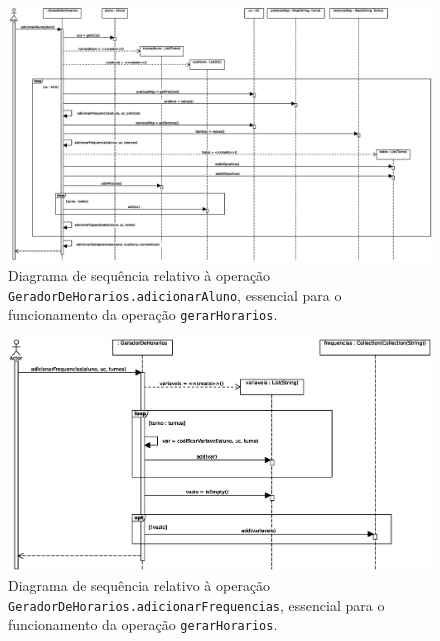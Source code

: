 \documentclass[12pt, a4paper]{article}
\begin{document}
\begin{landscape}
        \begin{figure}[H]
            \centering
            \includegraphics[scale=0.60]{Imagens/Modelos/gerarHorariosAdicionarAlunoDAO.svg.eps}
            \caption{
                Diagrama de sequência relativo à operação \texttt{GeradorDeHorarios.adicionarAluno},
                essencial para o funcionamento da operação \texttt{gerarHorarios}.
            }
        \end{figure}

        \vspace*{\fill}
        \pagebreak
        \vspace*{\fill}

        \begin{figure}[H]
            \centering
            \includegraphics[scale=1.0]{Imagens/Modelos/gerarHorariosAdicionarFrequenciasDAO.svg.eps}
            \caption{
                Diagrama de sequência relativo à operação \texttt{GeradorDeHorarios.adicionarFrequencias},
                essencial para o funcionamento da operação \texttt{gerarHorarios}.
            }
        \end{figure}


\end{landscape}
\end{document}
